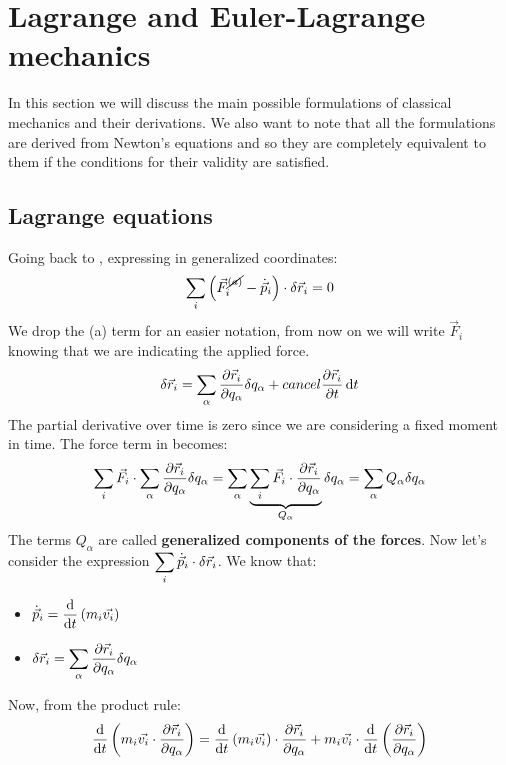 \chapter{Lagrange and Euler-Lagrange mechanics}
In this section we will discuss the main possible formulations of classical mechanics and their derivations. We also want to note that all the formulations are derived from Newton's equations and so they are completely equivalent to them if the conditions for their validity are satisfied.
\section{Lagrange equations}
Going back to \dalambertref, expressing in generalized coordinates:
\begin{equation}
    \displaystyle\sum_i \left(\vec{F}^{\cancel{(a)}}_i - \dot{\vec{p}}_i\right) \cdot \delta \vec{r}_i = 0
\end{equation}
We drop the (a) term for an easier notation, from now on we will write $\vec{F}_i$ knowing that we are indicating the applied force.
\begin{equation}
    \delta \vec{r}_i = \displaystyle\sum_{\alpha} \dfrac{\partial \vec{r}_i}{\partial q_{\alpha}} \delta q_{\alpha} + \\cancel{\dfrac{\partial \vec{r}_i}{\partial t} \dd{t}}
\end{equation}
The partial derivative over time is zero since we are considering a fixed moment in time. The force term in \dalambertref\;becomes:
\begin{equation}
    \displaystyle\sum_i \vec{F}_i \cdot \displaystyle\sum_{\alpha} \dfrac{\partial \vec{r}_i}{\partial q_{\alpha}} \delta q_{\alpha} = \displaystyle\sum_{\alpha}\underbrace{\displaystyle\sum_{i} \vec{F}_i \cdot \dfrac{\partial \vec{r}_i}{\partial q_{\alpha}}}_{Q_{\alpha}} \delta q_{\alpha} = \displaystyle\sum_{\alpha}Q_{\alpha}\delta q_{\alpha}
\end{equation}
The terms $Q_{\alpha}$ are called \textbf{generalized components of the forces}.
Now let's consider the expression $\displaystyle\sum_i \dot{\vec{p}}_i \cdot \delta \vec{r}_i$. We know that:
\begin{itemize}
    \item $\dvec{p}_i = \dv{}{t}\brackets{m_i\vec{v_i}}$
    \item $\delta \vec{r}_i = \displaystyle\sum_{\alpha} \dfrac{\partial \vec{r}_i}{\partial q_{\alpha}}\delta q_{\alpha}$
\end{itemize}
Now, from the product rule:
\begin{equation} \label{e:total_deriv}
    \dv{}{t}\brackets{m_i\vec{v_i} \cdot \dfrac{\partial \vec{r}_i}{\partial q_{\alpha}}} = \dv{}{t}\brackets{m_i\vec{v_i}}\cdot \dfrac{\partial \vec{r}_i}{\partial q_{\alpha}} + m_i\vec{v_i} \cdot \dv{}{t}\brackets{\dfrac{\partial \vec{r}_i}{\partial q_{\alpha}}}
\end{equation}
